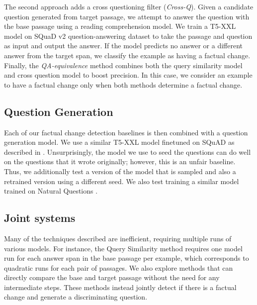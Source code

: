 The second approach adds a cross questioning filter (\textit{Cross-Q}). Given a candidate question generated from target passage, we attempt to answer the question with the base passage
using a reading comprehension model. We train a T5-XXL model  on SQuaD v2 \citep{rajpurkar-etal-2018-know} 
question-answering dataset to take the passage and question as input and output the answer. If the model predicts no answer or a different answer from the target span, we classify the example as having a factual change. 
Finally, the \textit{QA-equivalence} method combines both the query similarity model and cross question model to boost precision. In this case, we consider an example to have a factual change only when both methods determine a factual change.
\label{Method:Cross Question Answering}


\subsection{Question Generation}
\label{Method:Question Generation}
Each of our factual change detection baselines is then combined with a question generation model. We use a similar T5-XXL model finetuned on SQuAD as described in .
Unsurprisingly, the model we use to seed the questions can do well on the questions that it wrote originally; however, this is an unfair baseline. Thus, we additionally test a version of the model that is sampled and also a retrained version using a different seed. We also test training a similar model trained on Natural Questions \citep{kwiatkowski-etal-2019-natural}.

\subsection{Joint systems}
Many of the techniques described  are inefficient, requiring multiple runs of various models. For instance, the Query Similarity method requires one model run for each answer span in the base passage per example, which corresponds to quadratic runs for each pair of passages. We also explore methods that can directly compare the base and target passage without the need for any intermediate steps. These methods instead jointly detect if there is a factual change and generate a discriminating question.

